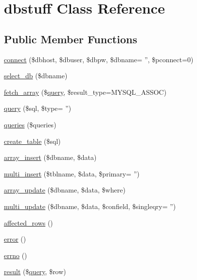 \hypertarget{classdbstuff}{\section{dbstuff Class Reference}
\label{classdbstuff}
}
\subsection*{Public Member Functions}
\begin{DoxyCompactItemize}
\item 
\hyperlink{classdbstuff_a1fa068d310eb6e0c4960e66e08f22fb9}{connect} (\$dbhost, \$dbuser, \$dbpw, \$dbname= '', \$pconnect=0)
\item 
\hyperlink{classdbstuff_aa186d41433113da48f8516d9d72f9928}{select\+\_\+db} (\$dbname)
\item 
\hyperlink{classdbstuff_af094e28ac34ba0515e500baf608612d2}{fetch\+\_\+array} (\$\hyperlink{classdbstuff_a00f34d535691c86e5674f6cace054c99}{query}, \$result\+\_\+type=M\+Y\+S\+Q\+L\+\_\+\+A\+S\+S\+O\+C)
\item 
\hyperlink{classdbstuff_a00f34d535691c86e5674f6cace054c99}{query} (\$sql, \$type= '')
\item 
\hyperlink{classdbstuff_a125ffb9369106fe64772f0609bb887b5}{queries} (\$queries)
\item 
\hyperlink{classdbstuff_ac31c94838b4b7e5d1d95af22d18c6100}{create\+\_\+table} (\$sql)
\item 
\hyperlink{classdbstuff_acc21de7672a614e1fbbd07a5f59649c8}{array\+\_\+insert} (\$dbname, \$data)
\item 
\hyperlink{classdbstuff_af607d3124b4e223a02cde6b17f98f058}{multi\+\_\+insert} (\$tblname, \$data, \$primary= '')
\item 
\hyperlink{classdbstuff_ad0513c82e699b53e31753b13b4d7d2b5}{array\+\_\+update} (\$dbname, \$data, \$where)
\item 
\hyperlink{classdbstuff_a2e7c303b79f20c4a10a8cadd8ca81b12}{multi\+\_\+update} (\$dbname, \$data, \$confield, \$singleqry= '')
\item 
\hyperlink{classdbstuff_a77248aaad33eb132c04cc4aa3f4bc8cb}{affected\+\_\+rows} ()
\item 
\hyperlink{classdbstuff_a43b8d30b879d4f09ceb059b02af2bc02}{error} ()
\item 
\hyperlink{classdbstuff_ab2eeb64cab360a0f09923108b55c9099}{errno} ()
\item 
\hyperlink{classdbstuff_a270f7c16a6797ce2cbdd403fb10638b9}{result} (\$\hyperlink{classdbstuff_a00f34d535691c86e5674f6cace054c99}{query}, \$row)

\end{DoxyCompactItemize}
